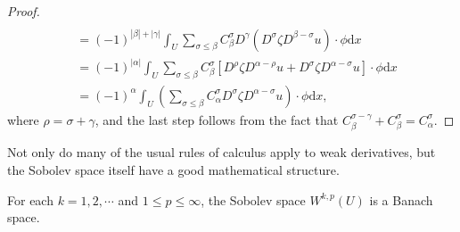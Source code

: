 \begin{proof}
$$\begin{aligned}
\\
&=\left( -1 \right) ^{\left| \beta \right|+\left| \gamma \right|}\int_U{\sum_{\sigma \le \beta}{C_{\beta}^{\sigma}D^{\gamma}\left( D^{\sigma}\zeta D^{\beta -\sigma}u \right)}\cdot \phi \mathrm{d}x}
\\
&=\left( -1 \right) ^{\left| \alpha \right|}\int_U{\sum_{\sigma \le \beta}{C_{\beta}^{\sigma}\left[ D^{\rho}\zeta D^{\alpha -\rho}u+D^{\sigma}\zeta D^{\alpha -\sigma}u \right]}\cdot \phi \mathrm{d}x}
\\
&=\left( -1 \right) ^{\alpha}\int_U{\left( \sum_{\sigma \le \beta}{C_{\alpha}^{\sigma}D^{\sigma}\zeta D^{\alpha -\sigma}u} \right) \cdot \phi \mathrm{d}x},
\end{aligned}
$$
where $\rho=\sigma+\gamma$, and the last step follows from the fact that $C_{\beta}^{\sigma-\gamma}+C_{\beta}^{\sigma}=C_{\alpha}^{\sigma}$.
\end{proof}
Not only do many of the usual rules of calculus apply to weak derivatives, but the Sobolev space itself have a good mathematical structure.
\begin{theorem}
For each $k=1,2,\cdots$ and $1\le p\le\infty$, the Sobolev space $W^{k,p}(U)$ is a Banach space.
\end{theorem}
